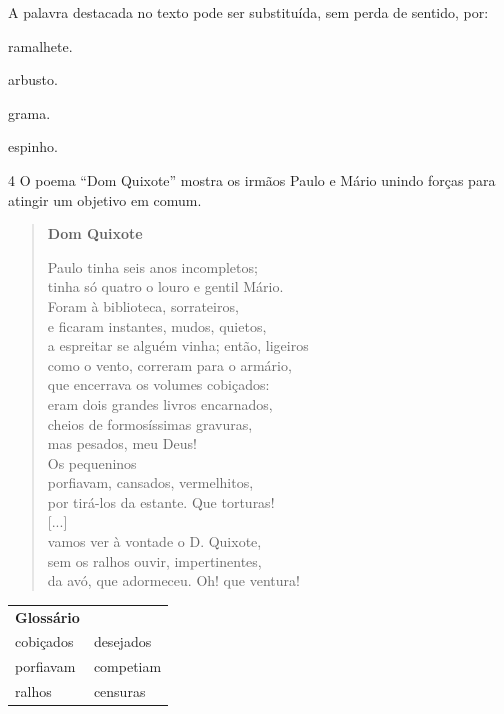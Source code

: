 A palavra destacada no texto pode ser substituída, sem perda de sentido,
por:

\begin{escolha}
\item ramalhete.

\item arbusto.

\item grama.

\item espinho.
\end{escolha}

\num{4} O poema ``Dom Quixote'' mostra os irmãos Paulo e Mário unindo
forças para atingir um objetivo em comum.

\begin{verse}
\textbf{Dom Quixote}

Paulo tinha seis anos incompletos;\\
tinha só quatro o louro e gentil Mário.\\
Foram à biblioteca, sorrateiros,\\
e ficaram instantes, mudos, quietos,\\
a espreitar se alguém vinha; então, ligeiros\\
como o vento, correram para o armário,\\
que encerrava os volumes cobiçados:\\
eram dois grandes livros encarnados,\\
cheios de formosíssimas gravuras,\\
mas pesados, meu Deus!\\
Os pequeninos\\
porfiavam, cansados, vermelhitos,\\
por tirá-los da estante. Que torturas!\\
{[}...{]}\\
vamos ver à vontade o D. Quixote,\\
sem os ralhos ouvir, impertinentes,\\
da avó, que adormeceu. Oh! que ventura!
\end{verse}


\begin{tabular}{ll}
\textbf{Glossário} & \mbox{}\\
cobiçados & desejados\\
porfiavam & competiam\\
ralhos & censuras\\
\end{tabular}

